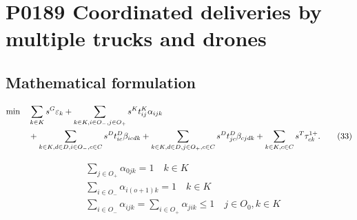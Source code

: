 \documentclass[10pt]{article}
\begin{document}
\section*{P0189 Coordinated deliveries by multiple trucks and drones}
\subsection*{Mathematical formulation}
\begin{align}
\min\quad&\sum_{k\in K}s^G\varepsilon_k+
\sum_{k\in K,i\in O_-,j\in O_+}s^Kt^K_{ij}\alpha_{ijk}\notag\\
&+\sum_{k\in K,d\in D,i\in O_-,c\in C}s^Dt^D_{ic}\beta_{icdk}
+\sum_{k\in K,d\in D,j\in O_+,c\in C}s^Dt^D_{jc}\beta_{cjdk}
+\sum_{k\in K,c\in C}s^T\tau_{ck}^{1+}.\tag{33}
\end{align}

\begin{align}
& \sum_{j \in O_+} \alpha_{0jk} = 1 \quad k \in K \\
& \sum_{i \in O_-} \alpha_{i(o+1)k} = 1 \quad k \in K \\
& \sum_{i \in O_-} \alpha_{ijk} = \sum_{i \in O_+} \alpha_{jik} \le 1 \quad j \in O_0, k \in K
\end{align}
\end{document}
